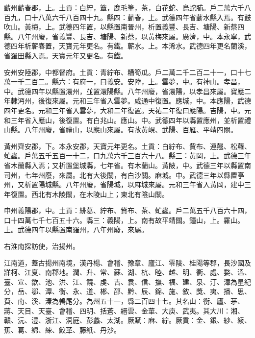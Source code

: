 \begin{pinyinscope}
 蘄州蘄春郡，上。土貢：白紵，簟，鹿毛筆，茶，白花蛇、烏蛇脯。戶二萬六千八百九，口十八萬六千八百四十九。縣四：蘄春，上。武德四年省蘄水縣入焉。有鼓吹山。黃梅，上。武德四年置，以縣置南晉州，析置義豐、長吉、塘陽、新蔡四縣。八年州廢，省義豐、長吉、塘陽、新蔡，以黃梅來屬。廣濟，中。本永寧，武德四年析蘄春置，天寶元年更名。有鐵。蘄水。上。本浠水。武德四年更名蘭溪，省羅田縣入焉。天寶元年又更名。有鐵。



 安州安陸郡，中都督府。土貢：青紵布、糟筍瓜。戶二萬二千二百二十一，口十七萬一千二百二。縣六：有府一，曰義安。安陸，上。雲夢，中。有神山。孝昌，中。武德四年以縣置澴州，並置澴陽縣。八年州廢，省澴陽，以孝昌來屬。寶應二年隸沔州，後復來屬。元和三年省入雲夢。咸通中復置。應城，中。本應陽，武德四年更名。元和三年省入雲夢，大和二年復置。天祐二年復曰應陽。吉陽，中。元和三年省入應山，後復置。有白兆山。應山。中。武德四年以縣置應州，並析置禮山縣。八年州廢，省禮山，以應山來屬。有故黃峴、武陽、百雁、平靖四關。



 黃州齊安郡，下。本永安郡，天寶元年更名。土貢：白紵布、貲布、連翹、松蘿、虻蟲。戶萬五千五百一十二，口九萬六千三百六十八。縣三：黃岡，上。武德三年省木蘭縣入焉；又析置堡城縣，七年省。有木蘭山。黃陂，中。武德三年以縣置南司州，七年州廢，來屬。北有大後關，有白沙關。麻城。中。武德三年以縣置亭州，又析置陽城縣。八年州廢，省陽城，以麻城來屬。元和三年省入黃岡，建中三年復置。西北有木陵關，在木陵山上；東北有陰山關。



 申州義陽郡，中。土貢：緋葛、紵布、貲布、茶、虻蟲。戶二萬五千八百六十四，口十四萬七千七百五十六。縣三：義陽，上。南有故平靖關。鐘山，上。羅山。上。武德四年以縣置南羅州，八年州廢，來屬。



 右淮南採訪使，治揚州。



 江南道，蓋古揚州南境，漢丹楊、會稽、豫章、廬江、零陵、桂陽等郡，長沙國及牂柯、江夏、南郡地。潤、升、常、蘇、湖、杭、睦、越、明、衢、處、婺、溫、臺、宣、歙、池、洪、江、饒、虔、吉、袁、信、撫、福、建、泉、汀、漳為星紀分，岳、鄂、潭、衡、永、道、郴、邵、黔、辰、錦、施、敘、獎、夷、播、思、費、南、溪、溱為鶉尾分。為州五十一，縣二百四十七。其名山：衡、廬、茅、蔣、天目、天臺、會稽、四明、括蒼、縉雲、金華、大庾、武夷。其大川：湘、贛、沅、澧、浙江、洞庭、彭蠡、太湖。厥賦：麻、紵。厥貢：金、銀、紗、綾、蕉、葛、綿、綀、鮫革、藤紙、丹沙。




\end{pinyinscope}
